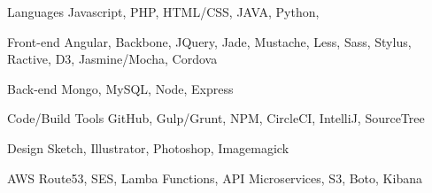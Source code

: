 

\begin{cvskills}
  \cvskill
    {Languages \hfill} %
    {Javascript, PHP, HTML/CSS, JAVA, Python, } %
  
  \cvskill
    {Front-end \hfill }
    {Angular, Backbone, JQuery, Jade, Mustache, Less, Sass, Stylus, Ractive, D3, Jasmine/Mocha, Cordova} 
  
  \cvskill
    {Back-end \hfill }  %
    {Mongo, MySQL, Node, Express}
    
  \cvskill
    {Code/Build Tools \hfill} %
    {GitHub, Gulp/Grunt, NPM, CircleCI, IntelliJ, SourceTree} %

 \cvskill
    {Design \hfill} %
    {Sketch, Illustrator, Photoshop, Imagemagick}
    
 \cvskill
    {AWS \hfill} 
    {Route53, SES, Lamba Functions, API Microservices, S3, Boto, Kibana} 
\end{cvskills}
\vspace{8pt}
